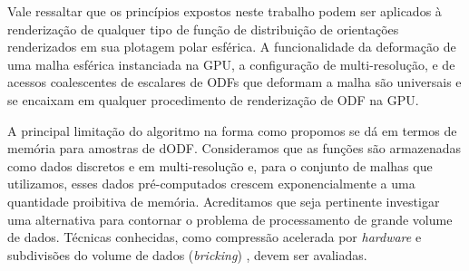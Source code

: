 \documentclass[
    12pt,                %
    oneside,            %
    a4paper,            %
    english,            %
    french,                %
    spanish,            %
    brazil                %
    ]{abntex2}
\begin{document}
Vale ressaltar que os princípios expostos neste trabalho podem ser aplicados à renderização de qualquer tipo de função de distribuição de orientações renderizados em sua plotagem polar esférica. A funcionalidade da deformação de uma malha esférica instanciada na GPU, a configuração de multi-resolução, e de acessos coalescentes de escalares de ODFs que deformam a malha são universais e se encaixam em qualquer procedimento de renderização de ODF na GPU.


A principal limitação  do algoritmo na forma como propomos se dá em termos de memória para amostras de dODF. Consideramos que as funções são armazenadas como dados discretos e em multi-resolução e, para o conjunto de malhas que utilizamos, esses dados pré-computados crescem exponencialmente a uma quantidade proibitiva de memória. Acreditamos que seja pertinente investigar uma alternativa para contornar o problema de processamento de grande volume de dados. Técnicas conhecidas, como compressão acelerada por \textit{hardware} \cite{sakharnykh2020} e subdivisões do volume de dados (\textit{bricking}) \cite{Beyer2014}, devem ser avaliadas.


\end{document}
